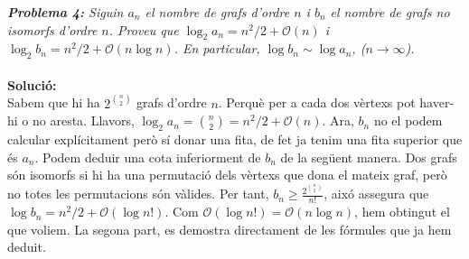 \documentclass[10pt]{article}
\begin{document}
\large
\textsl{\textbf{Problema 4:} Siguin $a_n$ el nombre de grafs d'ordre $n$ i $b_n$ el nombre de grafs no isomorfs d'ordre $n$. Proveu que $\log_2 a_n = n^2/2 + \mathcal{O}(n)$ i $\log_2 b_n = n^2/2+\mathcal{O}(n\log n)$. En particular, $\log b_n \sim \log a_n$, ($n\rightarrow \infty$).} \\ \\
\textbf{Solució:} \\
\normalsize
Sabem que hi ha $2^{{n}\choose{2}}$ grafs d'ordre $n$. Perquè per a cada dos vèrtexs pot haver-hi o no aresta. Llavors, $\log_2 a_n = {{n}\choose{2}} = n^2/2 + \mathcal{O}(n)$. Ara, $b_n$ no el podem calcular explícitament però sí donar una fita, de fet ja tenim una fita superior que és $a_n$. Podem deduir una cota inferiorment de $b_n$ de la següent manera. Dos grafs són isomorfs si hi ha una permutació dels vèrtexs que dona el mateix graf, però no totes les permutacions són vàlides. Per tant, $b_n\geq \frac{2^{{n}\choose{2}}}{n!}$, aixó assegura que $\log b_n = n^2/2 + \mathcal{O}(\log n!)$. Com $\mathcal{O}(\log n!)=\mathcal{O}(n\log n)$, hem obtingut el que voliem. La segona part, es demostra directament de les fórmules que ja hem deduit. \\ \\
\end{document}
